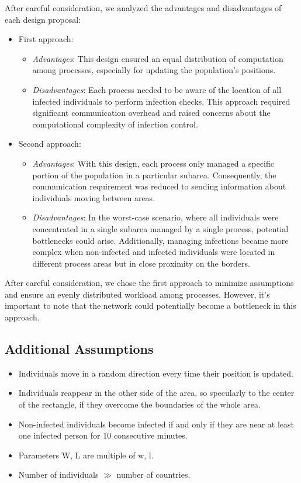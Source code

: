\documentclass[11pt]{article}
\begin{document}
After careful consideration, we analyzed the advantages and disadvantages of each design proposal:
\begin{itemize}
    \item First approach:
    \begin{itemize}
        \item \textit{Advantages}: This design ensured an equal distribution of computation among processes, especially for updating the population's positions.
        \item \textit{Disadvantages}: Each process needed to be aware of the location of all infected individuals to perform infection checks. This approach required significant communication overhead and raised concerns about the computational complexity of infection control.
    \end{itemize}
    \item Second approach:
    \begin{itemize}
        \item \textit{Advantages}: With this design, each process only managed a specific portion of the population in a particular subarea. Consequently, the communication requirement was reduced to sending information about individuals moving between areas.
        \item \textit{Disadvantages}: In the worst-case scenario, where all individuals were concentrated in a single subarea managed by a single process, potential bottlenecks could arise. Additionally, managing infections became more complex when non-infected and infected individuals were located in different process areas but in close proximity on the borders.
    \end{itemize}
\end{itemize}

After careful consideration, we chose the first approach to minimize assumptions and ensure an evenly distributed workload among processes. However, it's important to note that the network could potentially become a bottleneck in this approach.

\subsection{Additional Assumptions}
\begin{itemize}
    \item Individuals move in a random direction every time their position is updated.
    \item Individuals reappear in the other side of the area, so specularly to the center of the rectangle,  if they overcome the boundaries of the whole area.
    \item Non-infected individuals become infected if and only if they are near at least one infected person for 10 consecutive minutes.
    \item Parameters W, L are multiple of w, l.
    \item Number of individuals \(\gg\) number of countries.
\end{itemize}
\end{document}
